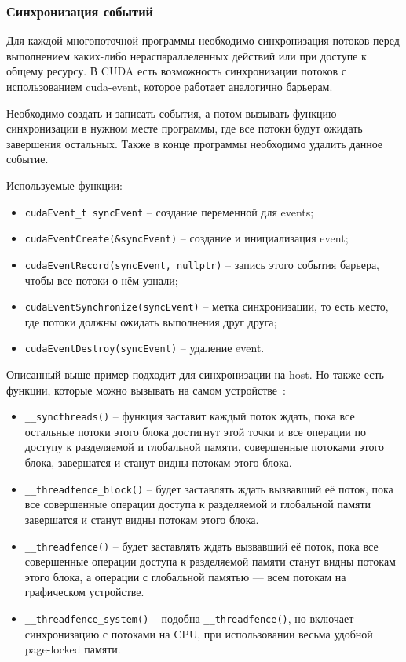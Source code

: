 \subsubsection*{Синхронизация событий}
Для каждой многопоточной программы необходимо синхронизация потоков перед выполнением каких-либо нераспараллеленных действий или при доступе к общему ресурсу. В CUDA есть возможность синхронизации потоков с использованием cuda-event, которое работает аналогично барьерам.

Необходимо создать и записать события, а потом вызывать функцию синхронизации в нужном месте программы, где все потоки будут ожидать завершения остальных. Также в конце программы необходимо удалить данное событие.

Используемые функции:
\begin{itemize}
    \item \texttt{cudaEvent\_t syncEvent} -- создание переменной для events;
    \item \texttt{cudaEventCreate(\&syncEvent)} -- создание и инициализация \linebreak event;
    \item \texttt{cudaEventRecord(syncEvent, nullptr)} -- запись этого события барьера, чтобы все потоки о нём узнали;
    \item \texttt{cudaEventSynchronize(syncEvent)} -- метка синхронизации, то есть место, где потоки должны ожидать выполнения друг друга;
    \item \texttt{cudaEventDestroy(syncEvent)} -- удаление event.
\end{itemize}

Описанный выше пример подходит для синхронизации на host. Но также есть функции, которые можно вызывать на самом устройстве~\cite{CudaSyncHabr}:
\begin{itemize}
    \item\texttt{\_\_syncthreads()} -- функция заставит каждый поток ждать, пока все остальные потоки этого блока достигнут этой точки и все операции по доступу к разделяемой и глобальной памяти, совершенные потоками этого блока, завершатся и станут видны потокам этого блока.
    \item\texttt{\_\_threadfence\_block()} -- будет заставлять ждать вызвавший её поток, пока все совершенные операции доступа к разделяемой и глобальной памяти завершатся и станут видны потокам этого блока.
    \item\texttt{\_\_threadfence()} -- будет заставлять ждать вызвавший её поток, пока все совершенные операции доступа к разделяемой памяти станут видны потокам этого блока, а операции с глобальной памятью — всем потокам на графическом устройстве.
    \item\texttt{\_\_threadfence\_system()} -- подобна \texttt{\_\_threadfence()}, но включает синхронизацию с потоками на CPU, при использовании весьма удобной page-locked памяти.
\end{itemize}

